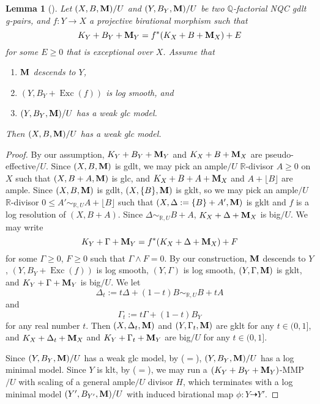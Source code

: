 \documentclass[11pt]{amsart}
\numberwithin{equation}{section}
\newcommand{\Mm}{{\bf{M}}}
\newcommand{\Qq}{\mathbb{Q}}
\newcommand{\Rr}{\mathbb{R}}
\newcommand{\Exc}{\operatorname{Exc}}
\newtheorem{lem}[thm]{Lemma}
\theoremstyle{definition}
\theoremstyle{definition}
\theoremstyle{definition}
\begin{document}
\begin{lem}[{\cite[Version 3, Lemma 3.19]{HL21}}]\label{lem: existence good minimal model under pullbacks weak glc case}
Let $(X,B,\Mm)/U$ and $(Y,B_Y,\Mm)/U$ be two $\Qq$-factorial NQC gdlt g-pairs, and $f: Y\rightarrow X$ a projective birational morphism such that
$$K_Y+B_Y+\Mm_Y=f^*(K_X+B+\Mm_X)+E$$
for some $E\geq 0$ that is exceptional over $X$. Assume that
\begin{enumerate}
\item $\Mm$ descends to $Y$,
\item $(Y,B_Y+\Exc(f))$ is log smooth, and
\item $(Y,B_Y,\Mm)/U$ has a weak glc model.
\end{enumerate}
Then $(X,B,\Mm)/U$ has a weak glc model.
\end{lem}
\begin{proof}
By our assumption, $K_Y+B_Y+\Mm_Y$ and $K_X+B+\Mm_X$ are pseudo-effective$/U$. Since $(X,B,\Mm)$ is gdlt, we may pick an ample$/U$ $\Rr$-divisor $A\geq 0$ on $X$ such that $(X,B+A,\Mm)$ is glc, and $K_X+B+A+\Mm_X$ and $A+\lfloor B\rfloor$ are ample. Since $(X,B,\Mm)$ is gdlt, $(X,\{B\},\Mm)$ is gklt, so we may pick an ample$/U$ $\Rr$-divisor $0\leq A'\sim_{\mathbb R,U}A+\lfloor B\rfloor$ such that $(X,\Delta:=\{B\}+A',\Mm)$ is gklt and $f$ is a log resolution of $(X,B+A)$. Since $\Delta\sim_{\Rr,U}B+A$, $K_X+\Delta+\Mm_X$ is big$/U$. We may write
$$K_Y+\Gamma+\Mm_Y=f^*(K_X+\Delta+\Mm_X)+F$$
for some $\Gamma\geq 0$, $F\geq 0$ such that $\Gamma\wedge F=0$. By our construction, $\Mm$ descends to $Y$, $(Y,B_Y+\Exc(f))$ is log smooth, $(Y,\Gamma)$ is log smooth, $(Y,\Gamma,\Mm)$ is gklt, and $K_Y+\Gamma+\Mm_Y$ is big$/U$. We let
$$\Delta_t:=t\Delta+(1-t)B\sim_{\mathbb R,U}B+tA$$
and
$$\Gamma_t:=t\Gamma+(1-t)B_Y$$
for any real number $t$. Then $(X,\Delta_t,\Mm)$ and $(Y,\Gamma_t,\Mm)$ are gklt for any $t\in (0,1]$, and $K_X+\Delta_t+\Mm_X$ and $K_Y+\Gamma_t+\Mm_Y$ are big$/U$ for any $t\in (0,1]$. 



Since $(Y,B_Y,\Mm)/U$ has a weak glc model, by \cite[Lemma 3.8]{HL21} ($=$\cite[Version 3, Lemma 3.15]{HL21}),  $(Y,B_Y,\Mm)/U$ has a log minimal model. Since $Y$ is klt, by \cite[Theorem 2.8]{HL21} ($=$\cite[Version 3,Theorem 2.24]{HL21}), we may run a $(K_Y+B_Y+\Mm_Y)$-MMP$/U$ with scaling of a general ample$/U$ divisor $H$, which terminates with a log minimal model $(Y',B_{Y'},\Mm)/U$ with induced birational map $\phi: Y\dashrightarrow Y'$. 


\end{proof}
\end{document}
